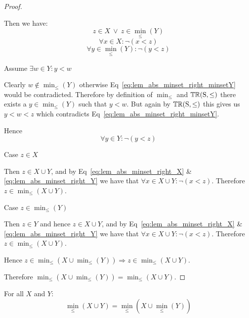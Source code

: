 \begin{proof}
\begin{ind}
Then we have:
\begin{equation}
z \in X \ \vee \ z \in \min_\leq(Y)
\end{equation}
\begin{equation} \label{eq:lem_abs_minset_right_X}
\forall x \in X : \neg (x < z)
\end{equation}
\begin{equation} \label{eq:lem_abs_minset_right_minsetY}
\forall y \in \min_\leq(Y) : \neg (y < z)
\end{equation}

Assume $\exists w \in Y : y < w$
\begin{ind}
Clearly $w \notin \min_\leq(Y)$ otherwise Eq~\ref{eq:lem_abs_minset_right_minsetY} would be contradicted. Therefore by definition of $\min_\leq$ and ${\mathbb{TR}}(\mathrm{S, \leq})$ there exists a $y \in \min_\leq(Y)$ such that $y < w$. But again by ${\mathbb{TR}}(\mathrm{S, \leq})$ this gives us $y < w < z$ which contradicts Eq~\ref{eq:lem_abs_minset_right_minsetY}.
\end{ind}
Hence
\begin{equation} \label{eq:lem_abs_minset_right_Y}
\forall y \in Y : \neg (y < z)
\end{equation}

Case $z \in X$
\begin{ind}
Then $z \in X \cup Y$, and by Eq~\ref{eq:lem_abs_minset_right_X} \& \ref{eq:lem_abs_minset_right_Y} we have that $\forall x \in X \cup Y : \neg (x < z)$. Therefore $z \in \min_\leq(X \cup Y)$.
\end{ind}

Case $z \in \min_\leq(Y)$
\begin{ind}
Then $z \in Y$ and hence $z \in X \cup Y$, and by Eq~\ref{eq:lem_abs_minset_right_X} \& \ref{eq:lem_abs_minset_right_Y} we have that $\forall x \in X \cup Y : \neg (x < z)$. Therefore $z \in \min_\leq(X \cup Y)$.
\end{ind}
Hence $z \in \min_\leq(X \cup \min_\leq(Y)) \Rightarrow z \in \min_\leq(X \cup Y)$.
\end{ind}

\vspace{1em}

Therefore $\min_\leq(X \cup \min_\leq(Y)) = \min_\leq(X \cup Y)$. 
\end{proof}


\vspace{2em}


\begin{lemma} \label{lem:minunion_right_absorption}
For all $X$ and $Y$:
\begin{equation}
\min_\leq(X \cup Y) = \min_\leq(X \cup \min_\leq(Y))
\end{equation}
\end{lemma}


